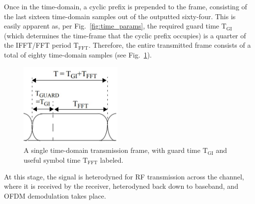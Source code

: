 \documentclass[journal]{IEEEtran}
\begin{document}
Once in the time-domain, a cyclic prefix is prepended to the frame, consisting of the last sixteen time-domain samples out of the outputted sixty-four. This is easily apparent as, per Fig.~\ref{fig:time_params}, the required guard time $\text{T}_\text{GI}$ (which determines the time-frame that the cyclic prefix occupies) is a quarter of the IFFT/FFT period $\text{T}_\text{FFT}$. Therefore, the entire transmitted frame consists of a total of eighty time-domain samples (see Fig.~\ref{fig:Frame}).
\begin{figure}
    \centering
    \includegraphics[width = 0.45\textwidth]{Frame}
    \caption{A single time-domain transmission frame, with guard time $\text{T}_\text{GI}$ and useful symbol time $\text{T}_\text{FFT}$ labeled.}
    \label{fig:Frame}
\end{figure}

At this stage, the signal is heterodyned for RF transmission across the channel, where it is received by the receiver, heterodyned back down to baseband, and OFDM demodulation takes place.






%	
\end{document}
